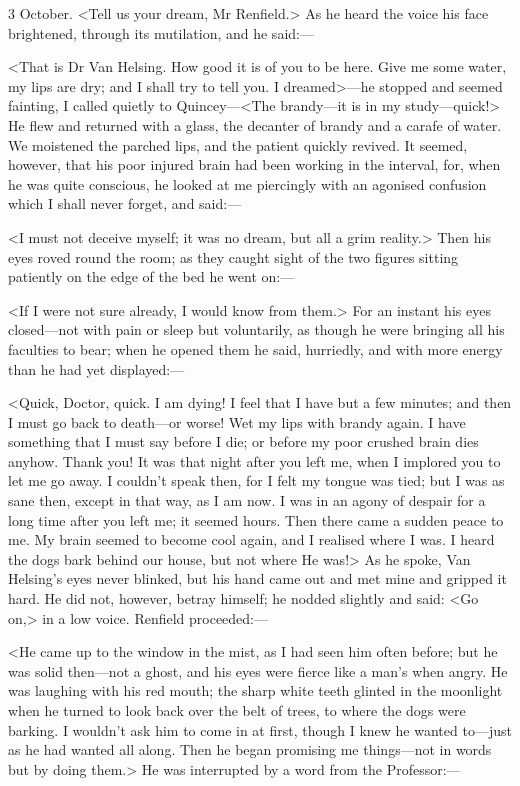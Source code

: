 \begin{diary}{3 October.}
<Tell us your dream, Mr Renfield.> As he heard the voice his face brightened, through its mutilation, and he said:—

<That is Dr Van Helsing. How good it is of you to be here. Give me some water, my lips are dry; and I shall try to tell you. I dreamed>—he stopped and seemed fainting, I called quietly to Quincey—<The brandy—it is in my study—quick!> He flew and returned with a glass, the decanter of brandy and a carafe of water. We moistened the parched lips, and the patient quickly revived. It seemed, however, that his poor injured brain had been working in the interval, for, when he was quite conscious, he looked at me piercingly with an agonised confusion which I shall never forget, and said:—

<I must not deceive myself; it was no dream, but all a grim reality.> Then his eyes roved round the room; as they caught sight of the two figures sitting patiently on the edge of the bed he went on:—

<If I were not sure already, I would know from them.> For an instant his eyes closed—not with pain or sleep but voluntarily, as though he were bringing all his faculties to bear; when he opened them he said, hurriedly, and with more energy than he had yet displayed:—

<Quick, Doctor, quick. I am dying! I feel that I have but a few minutes; and then I must go back to death—or worse! Wet my lips with brandy again. I have something that I must say before I die; or before my poor crushed brain dies anyhow. Thank you! It was that night after you left me, when I implored you to let me go away. I couldn't speak then, for I felt my tongue was tied; but I was as sane then, except in that way, as I am now. I was in an agony of despair for a long time after you left me; it seemed hours. Then there came a sudden peace to me. My brain seemed to become cool again, and I realised where I was. I heard the dogs bark behind our house, but not where He was!> As he spoke, Van Helsing's eyes never blinked, but his hand came out and met mine and gripped it hard. He did not, however, betray himself; he nodded slightly and said: <Go on,> in a low voice. Renfield proceeded:—

<He came up to the window in the mist, as I had seen him often before; but he was solid then—not a ghost, and his eyes were fierce like a man's when angry. He was laughing with his red mouth; the sharp white teeth glinted in the moonlight when he turned to look back over the belt of trees, to where the dogs were barking. I wouldn't ask him to come in at first, though I knew he wanted to—just as he had wanted all along. Then he began promising me things—not in words but by doing them.> He was interrupted by a word from the Professor:—


\end{diary}
